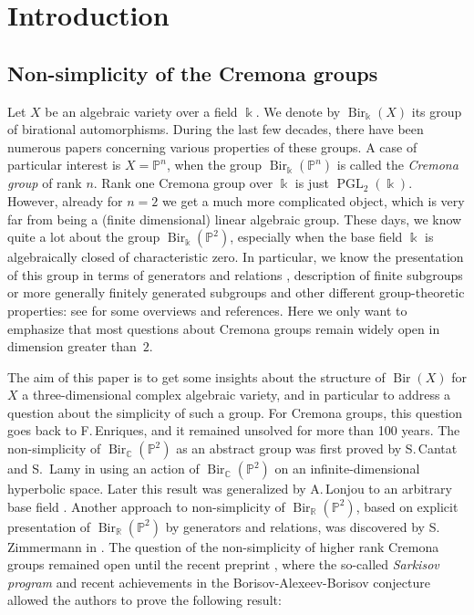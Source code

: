 \documentclass[JEP,XML,SOM,Unicode,NoFloatCountersInSection]{cedram}
\DeclareMathOperator{\Bir}{Bir}
\DeclareMathOperator{\PGL}{PGL}
\theoremstyle{plain}
\theoremstyle{definition}
\newcommand{\CC}{\mathbb C}
\newcommand{\kk}{\Bbbk}
\newcommand{\RR}{\mathbb R}
\newcommand{\PP}{\mathbb P}
\begin{document}
\maketitle
\tableofcontents
\mainmatter

\section{Introduction}\label{sec:intro}

\subsection{Non-simplicity of the Cremona groups} Let $X$ be an algebraic variety over a field $\kk$. We denote by $\Bir_\kk(X)$ its group of birational automorphisms. During the last few decades, there have been numerous papers concerning various properties of these groups. A case of particular interest is $X=\PP^n$, when the group $\Bir_\kk(\PP^n)$ is called the \emph{Cremona group} of rank $n$. Rank one Cremona group over $\kk$ is just $\PGL_2(\kk)$. However, already for $n=2$ we get a much more complicated object, which is very far from being a (finite dimensional) linear algebraic group. These days, we know quite a lot about the group $\Bir_\kk(\PP^2)$, especially when the base field $\kk$ is algebraically closed of characteristic zero. In particular, we know the presentation of this group in terms of generators and relations \cite{Gizatullin,IKT,UZ}, description of finite subgroups \cite{DI} or more generally finitely generated subgroups and other different group-theoretic properties: see \cite{Cantat13,Deserti19} for some overviews and references. Here we only want to emphasize that most questions about Cremona groups remain widely open in dimension greater than~$2$.

The aim of this paper is to get some insights about the structure of $\Bir(X)$ for $X$ a three-dimensional complex algebraic variety, and in particular to address a question about the simplicity of such a group. For Cremona groups, this question goes back to F.\,Enriques, and it remained unsolved for more than 100 years. The non-simplicity of $\Bir_\CC(\PP^2)$ as an abstract group was first proved by S.\,Cantat and S.~Lamy in \cite{CantatLamy} using an action of $\Bir_\CC(\PP^2)$ on an infinite-dimensional hyperbolic space. Later this result was generalized by A.\,Lonjou to an arbitrary base field \cite{Lonjou}. Another approach to non-simplicity of $\Bir_\RR(\PP^2)$, based on explicit presentation of $\Bir_\RR(\PP^2)$ by generators and relations, was discovered by S.\,Zimmermann in \cite{Zimmermann}. The question of the non-simplicity of higher rank Cremona groups remained open until the recent preprint \cite{BLZ}, where the so-called \emph{Sarkisov program} and recent achievements in the Borisov-Alexeev-Borisov conjecture \cite{BirkarA} allowed the authors to prove the following result:
\end{document}
